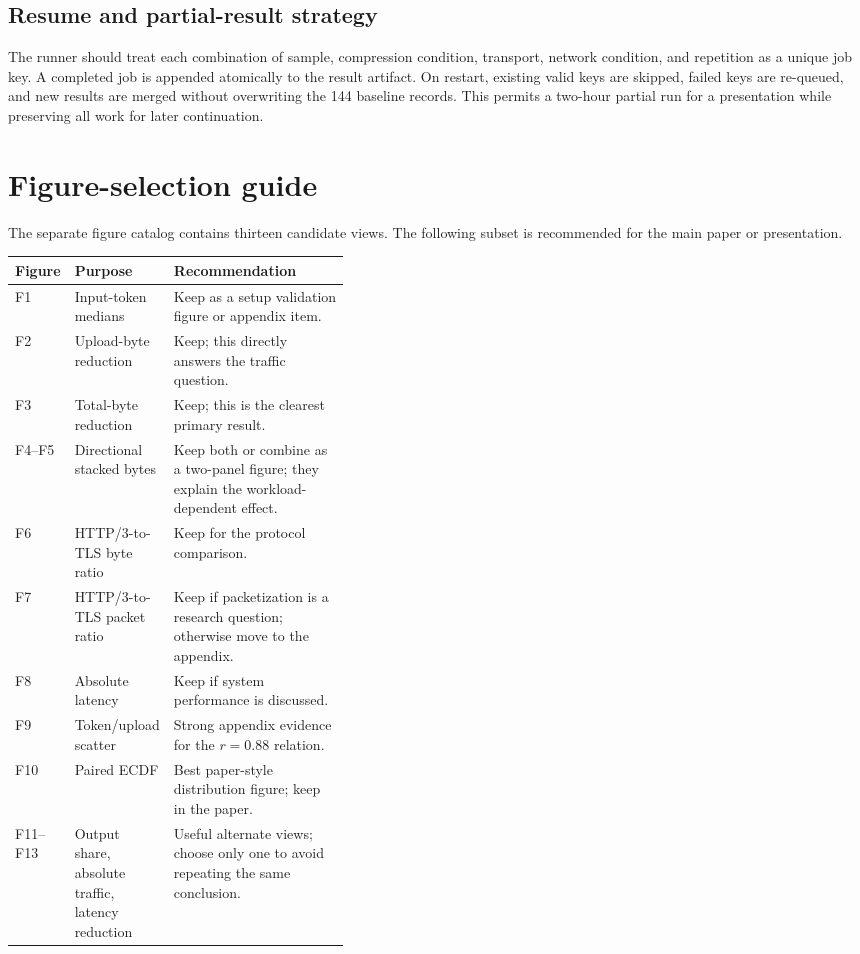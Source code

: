 \documentclass[10pt]{article}
\begin{document}
\subsection{Resume and partial-result strategy}

The runner should treat each combination of sample, compression condition,
transport, network condition, and repetition as a unique job key. A completed
job is appended atomically to the result artifact. On restart, existing valid
keys are skipped, failed keys are re-queued, and new results are merged without
overwriting the 144 baseline records. This permits a two-hour partial run for a
presentation while preserving all work for later continuation.

\clearpage
\section{Figure-selection guide}

The separate figure catalog contains thirteen candidate views. The following
subset is recommended for the main paper or presentation.

\begin{center}
\small
\renewcommand{\arraystretch}{1.25}
\begin{tabularx}{\linewidth}{@{}p{0.10\linewidth}p{0.29\linewidth}Y@{}}
\toprule
\textbf{Figure} & \textbf{Purpose} & \textbf{Recommendation} \\
\midrule
F1 & Input-token medians & Keep as a setup validation figure or appendix item. \\
F2 & Upload-byte reduction & Keep; this directly answers the traffic question. \\
F3 & Total-byte reduction & Keep; this is the clearest primary result. \\
F4--F5 & Directional stacked bytes & Keep both or combine as a two-panel figure;
they explain the workload-dependent effect. \\
F6 & HTTP/3-to-TLS byte ratio & Keep for the protocol comparison. \\
F7 & HTTP/3-to-TLS packet ratio & Keep if packetization is a research question;
otherwise move to the appendix. \\
F8 & Absolute latency & Keep if system performance is discussed. \\
F9 & Token/upload scatter & Strong appendix evidence for the $r=0.88$ relation. \\
F10 & Paired ECDF & Best paper-style distribution figure; keep in the paper. \\
F11--F13 & Output share, absolute traffic, latency reduction & Useful alternate
views; choose only one to avoid repeating the same conclusion. \\
\bottomrule
\end{tabularx}
\end{center}
\end{document}
